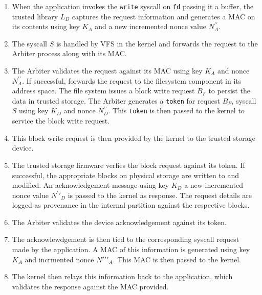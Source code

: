 \documentclass[withindex,glossary]{cam-thesis}
\begin{document}
\begin{enumerate}[Step a:]

\item When the application invokes the \texttt{write} syscall on \texttt{fd} passing it a buffer, the trusted library $L_D$ captures the request information and generates a MAC on its contents using key $K_A$ and a new incremented nonce value $N^{\prime\prime}_A$.

\item The syscall $S$ is handled by VFS in the kernel and forwards the request to the Arbiter process along with its MAC.

\item The Arbiter validates the request against its MAC using key $K_A$ and nonce $N^{\prime\prime}_A$.
If successful, forwards the request to the filesystem component in its address space.
The file system issues a block write request $B_F$ to persist the data in trusted storage.
The Arbiter generates a \texttt{token} for request $B_F$, syscall $S$ using key $K_D$ and nonce $N^{\prime\prime}_D$.
This \texttt{token} is then passed to the kernel to service the block write request.

\item This block write request is then provided by the kernel to the trusted storage device.

\item The trusted storage firmware verfies the block request against its token.
If successful, the appropriate blocks on physical storage are written to and modified.
An acknowledgement message using key $K_D$ a new incremented nonce value $N^\prime\prime_D$ is passed to the kernel as response.
The request details are logged as provenance in the internal partition against the respective blocks.

\item The Arbiter validates the device acknowledgement against its token.

\item The acknowlewdgement is then tied to the corresponding syscall request made by the application.
A MAC of this information is generated using key $K_A$ and incrmented nonce $N\prime\prime\prime_A$.
This MAC is then passed to the kernel.

\item The kernel then relays this information back to the application, which validates the response against the MAC provided.

\end{enumerate}
\end{document}
